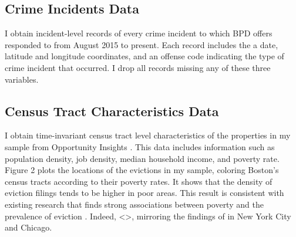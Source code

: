 \documentclass[12pt]{article}
\begin{document}
    \subsection{Crime Incidents Data}
    I obtain incident-level records of every crime incident to which BPD offers responded to from August 2015 to present. Each record includes the a date, latitude and longitude coordinates, and an offense code indicating the type of crime incident that occurred. I drop all records missing any of these three variables.  

    \subsection{Census Tract Characteristics Data}
    I obtain time-invariant census tract level characteristics of the properties in my sample from Opportunity Insights \citep{chetty_impacts_2018}. This data includes information such as population density, job density, median household income, and poverty rate. Figure 2 plots the locations of the evictions in my sample, coloring Boston's census tracts according to their poverty rates. It shows that the density of eviction filings tends to be higher in poor areas. This result is consistent with existing research that finds strong associations between poverty and the prevalence of eviction \citep{desmond_housing_2016}. Indeed, <>, mirroring the findings of \cite{collinson_eviction_2022} in New York City and Chicago.
    
\end{document}
